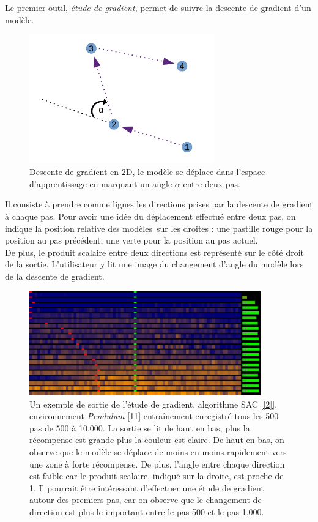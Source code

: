 \documentclass[12pt]{article}
\begin{document}
Le premier outil, \emph{étude de gradient}, permet de suivre la descente de gradient d’un modèle. \\

\begin{figure}[!htp]
    \centering
    \includegraphics[width=8cm]{Images/gradientStudy_dessus}
    \caption{Descente de gradient en 2D, le modèle se déplace dans l'espace d'apprentissage en marquant un angle $\alpha$ entre deux pas.}
    \label{fig:gradientStudyAbove}
\end{figure}

Il consiste à prendre comme lignes les directions prises par la descente de gradient à chaque pas. Pour avoir une idée du déplacement effectué entre deux pas, on indique la position relative des modèles sur les droites : une pastille rouge pour la position au pas précédent, une verte pour la position au pas actuel. \\

De plus, le produit scalaire entre deux directions est représenté sur le côté droit de la sortie. L'utilisateur y lit une image du changement d'angle du modèle lors de la descente de gradient. \\

\begin{figure}[!htp]
    \centering
    \includegraphics[width=10cm]{Images/gradientStudy}
    \caption{Un exemple de sortie de l'étude de gradient, algorithme SAC \ref{[2]}, environnement \emph{Pendulum} \href{https://pendulum.eustace.io/docs/}{[11]}  entraînement enregistré tous les 500 pas de 500 à 10.000. La sortie se lit de haut en bas, plus la récompense est grande plus la couleur est claire. De haut en bas, on observe que le modèle se déplace de moins en moins rapidement vers une zone à forte récompense. De plus, l'angle entre chaque direction est faible car le produit scalaire, indiqué sur la droite, est proche de 1. Il pourrait être intéressant d'effectuer une étude de gradient autour des premiers pas, car on observe que le changement de direction est plus le important entre le pas 500 et le pas 1.000.}
    \label{fig:gradientStudy}
\end{figure}
\end{document}
